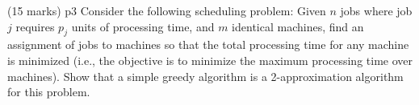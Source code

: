 \documentclass[a4paper, 11pt]{article}
\begin{document}

\begin{problem}{%
		\hfill  (15 marks)
	}{p3%
	}
Consider the following scheduling problem: Given $n$ jobs where job $j$ requires $p_j$ units of processing time, and $m$ identical machines, find an assignment of jobs to machines so that the total processing time for any machine is minimized (i.e., the objective is to minimize the maximum processing time over machines). Show that a simple greedy algorithm is a 2-approximation algorithm for this problem.
\end{problem}
\end{document}
